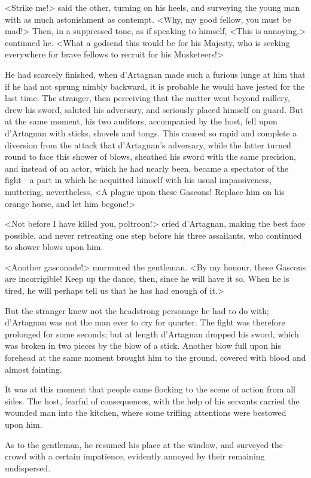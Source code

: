 <Strike me!> said the other, turning on his heels, and surveying the young man with as much astonishment as contempt. <Why, my good fellow, you must be mad!> Then, in a suppressed tone, as if speaking to himself, <This is annoying,> continued he. <What a godsend this would be for his Majesty, who is seeking everywhere for brave fellows to recruit for his Musketeers!> 

He had scarcely finished, when d'Artagnan made such a furious lunge at him that if he had not sprung nimbly backward, it is probable he would have jested for the last time. The stranger, then perceiving that the matter went beyond raillery, drew his sword, saluted his adversary, and seriously placed himself on guard. But at the same moment, his two auditors, accompanied by the host, fell upon d'Artagnan with sticks, shovels and tongs. This caused so rapid and complete a diversion from the attack that d'Artagnan's adversary, while the latter turned round to face this shower of blows, sheathed his sword with the same precision, and instead of an actor, which he had nearly been, became a spectator of the fight---a part in which he acquitted himself with his usual impassiveness, muttering, nevertheless, <A plague upon these Gascons! Replace him on his orange horse, and let him begone!> 

<Not before I have killed you, poltroon!> cried d'Artagnan, making the best face possible, and never retreating one step before his three assailants, who continued to shower blows upon him. 

<Another gasconade!> murmured the gentleman. <By my honour, these Gascons are incorrigible! Keep up the dance, then, since he will have it so. When he is tired, he will perhaps tell us that he has had enough of it.> 

But the stranger knew not the headstrong personage he had to do with; d'Artagnan was not the man ever to cry for quarter. The fight was therefore prolonged for some seconds; but at length d'Artagnan dropped his sword, which was broken in two pieces by the blow of a stick. Another blow full upon his forehead at the same moment brought him to the ground, covered with blood and almost fainting. 

It was at this moment that people came flocking to the scene of action from all sides. The host, fearful of consequences, with the help of his servants carried the wounded man into the kitchen, where some trifling attentions were bestowed upon him. 

As to the gentleman, he resumed his place at the window, and surveyed the crowd with a certain impatience, evidently annoyed by their remaining undispersed. 

